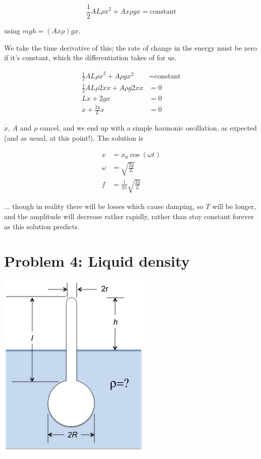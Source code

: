 \documentclass[8.01x]{subfiles}
\begin{document}
\begin{equation}
\frac{1}{2} A L \rho \dot{x}^2 + A x \rho g x = \text{constant}
\end{equation}

using $m g h = (A x \rho) g x$.

We take the time derivative of this; the rate of change in the energy must be zero if it's constant, which the differentiation takes of for us.

\begin{align}
\frac{1}{2} A L \rho \dot{x}^2 + A \rho g x^2 &= \text{constant}\\
\frac{1}{2} A L \rho 2 \dot{x} \ddot{x} + A \rho g 2 x \dot{x} &= 0\\
L  \ddot{x} + 2 g x &= 0\\
\ddot{x} + \frac{2 g}{L} x &= 0
\end{align}

$\dot{x}$, $A$ and $\rho$ cancel, and we end up with a simple harmonic oscillation, as expected (and as usual, at this point!). The solution is

\begin{align}
x &= x_0 \cos(\omega t)\\
\omega &= \sqrt{\frac{2 g}{L}}\\
f &= \frac{1}{2\pi} \sqrt{\frac{2 g}{L}}
\end{align}

... though in reality there will be losses which cause damping, so $T$ will be longer, and the amplitude will decrease rather rapidly, rather than stay constant forever as this solution predicts.

\section{Problem 4: Liquid density}

\begin{center}
\includegraphics[scale=0.7]{Graphics/h10p4}
\end{center}
\end{document}
